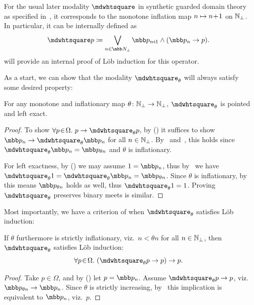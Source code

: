 \begin{remark}\label{usualmodalitypos}
  For the usual later modality $\bx$ in synthetic guarded domain theory as specified in~\citet{birkedal_first_2012}, it corresponds to the monotone inflation map $n \mapsto n\!+\!1$ on $\mathbb{N}_\bot$. In particular, it can be internally defined as  
  \[ \bx p \coloneq \bigvee_{n\in\ovob}\mbb p_{n\plo} \wedge (\mbb p_{n} \to p). \]
   will provide an internal proof of L\"ob induction for this operator.
\end{remark}

As a start, we can show that the modality $\bx_\theta$ will always satisfy some desired property:

\begin{proposition}\label{posproplex}
  For any monotone and inflationary map $\theta \colon \mathbb{N}_\bot \to \mathbb{N}_\bot$, $\bx_\theta$ is pointed and left exact.
\end{proposition}
\begin{proof}
  To show $\fa p{\Omega}p \to \bx_\theta p$, by (\AxiomGR) it suffices to show $\mbb p_{n} \to \bx_\theta\mbb p_{n}$ for all $n\in\mathbb{N}_\bot$. By~ and~, this holds since $\bx_\theta\mbb p_{n} = \mbb p_{\theta n}$ and $\theta$ is inflationary. 
  
  For left exactness, by (\AxiomGR) we may assume $1 = \mbb p_{n}$, thus by~ we have $\bx_\theta 1 = \bx_\theta\mbb p_{n} = \mbb p_{\theta n}$. Since $\theta$ is inflationary, by~ this means $\mbb p_{\theta n}$ holds as well, thus $\bx_\theta 1 = 1$. Proving $\bx_\theta$ preserves binary meets is similar.
\end{proof}

Most importantly, we have a criterion of when $\bx_\theta$ satisfies L\"ob induction:

\begin{theorem}\label{lobprop}
  If $\theta$ furthermore is strictly inflationary, viz.\ $n < \theta n$ for all $n\in\mathbb{N}_\bot$, then $\bx_\theta$ satisfies L\"ob induction:
  \[ \fa p{\Omega} (\bx_\theta p \to p) \to p. \]
\end{theorem}
\begin{proof}
  Take $p\in\Omega$, and by (\AxiomGR) let $p = \mbb p_{n}$. Assume $\bx_\theta p \to p$, viz. $\mbb p_{\theta n} \to \mbb p_{n}$. Since $\theta$ is strictly increasing, by~ this implication is equivalent to $\mbb p_{n}$, viz.\ $p$.
\end{proof}

